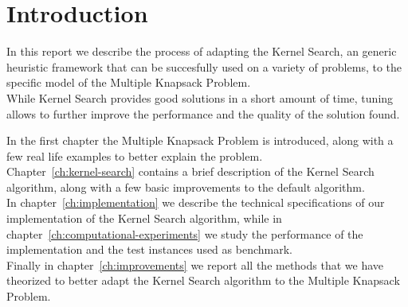 \chapter{Introduction}

In this report we describe the process of adapting the Kernel Search,
an generic heuristic framework that can be succesfully used on a variety of
problems, to the specific model of the Multiple Knapsack Problem.\\
While Kernel Search provides good solutions in a short amount of time,
tuning allows to further improve the performance and the quality of the solution found.

In the first chapter the Multiple Knapsack Problem is introduced,
along with a few real life examples to better explain the problem.\\
Chapter~\ref{ch:kernel-search} contains a brief description of the Kernel Search algorithm,
along with a few basic improvements to the default algorithm.\\
In chapter~\ref{ch:implementation} we describe the technical
specifications of our implementation of the Kernel Search algorithm,
while in chapter~\ref{ch:computational-experiments} we study
the performance of the implementation and the test instances used as benchmark.\\
Finally in chapter~\ref{ch:improvements} we report all
the methods that we have theorized to better adapt the Kernel Search
algorithm to the Multiple Knapsack Problem.
